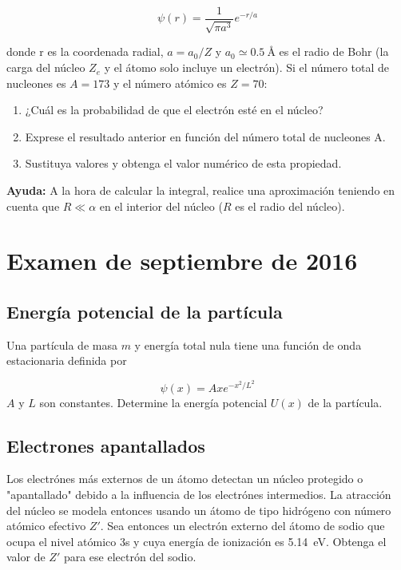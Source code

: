 \documentclass[12pt, a4paper]{article}
\begin{document}
    $$\psi(r)=\frac{1}{\sqrt{\pi a^3}}e^{-r/a}$$

    donde r es la coordenada radial, $a=a_0/Z$ y $a_0\simeq\SI{0.5}{\angstrom}$ es el radio de Bohr
    (la carga del núcleo $Z_e$ y el átomo solo incluye un electrón). Si el número total de
    nucleones es $A=173$ y el número atómico es $Z=70$:

    \begin{enumerate}[label=\alph*)]
        \item ¿Cuál es la probabilidad de que el electrón esté en el núcleo?
        \item Exprese el resultado anterior en función del número total de nucleones A.
        \item Sustituya valores y obtenga el valor numérico de esta propiedad.
    \end{enumerate}
    \textbf{Ayuda:} A la hora de calcular la integral, realice una aproximación teniendo en cuenta
    que $R\ll\alpha$ en el interior del núcleo ($R$ es el radio del núcleo).



    \section{Examen de septiembre de 2016}
    \setcounter{subsection}{0}
    \subsection{Energía potencial de la partícula}
    Una partícula de masa $m$ y energía total nula tiene una función de onda estacionaria
    definida por

    $$\psi(x)=Axe^{-x^2/L^2}$$
    $A$ y $L$ son constantes. Determine la energía potencial $U(x)$ de la partícula.


    \subsection{Electrones apantallados}
    Los electrónes más externos de un átomo detectan un núcleo protegido o "apantallado"
    debido a la influencia de los electrónes intermedios. La atracción del núcleo se modela
    entonces usando un átomo de tipo hidrógeno con número atómico efectivo $Z'$. Sea entonces
    un electrón externo del átomo de sodio que ocupa el nivel atómico 3s y cuya energía
    de ionización es \SI{5.14}{\electronvolt}. Obtenga el valor de $Z'$ para ese electrón del sodio.
\end{document}
